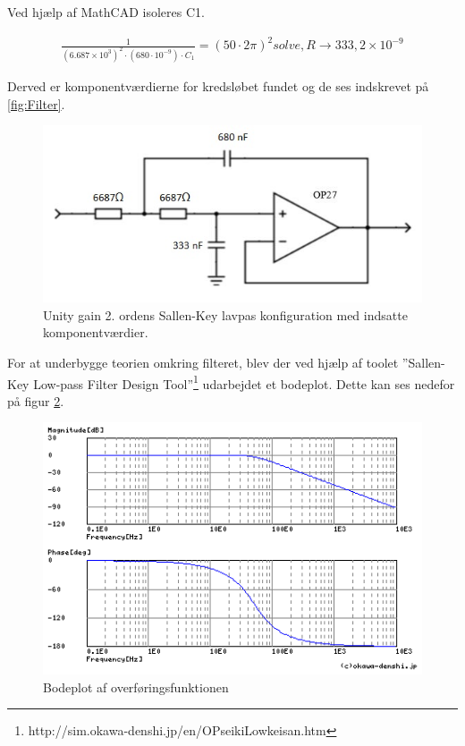 Ved hjælp af MathCAD isoleres C1. 

\begin{align}
	\frac{1}{(6.687\times 10^{3})^{2}\cdot(680\cdot10^{-9})\cdot C_1}=(50\cdot 2\pi)^{2} solve, R \to 333,2\times 10^{-9}
\end{align}

Derved er komponentværdierne for kredsløbet fundet og de ses indskrevet på \ref{fig:Filter}. 

\begin{figure}[H]
	\centering
	\includegraphics[width=1\textwidth]{Figurer/Hardware/FilterDesignMedKomponentvaerdier}
	\caption{Unity gain 2. ordens Sallen-Key lavpas konfiguration med indsatte komponentværdier.}
	\label{fig:Filter_K}
\end{figure}

For at underbygge teorien omkring filteret, blev der ved hjælp af toolet ”Sallen-Key Low-pass Filter Design Tool”\footnote{http://sim.okawa-denshi.jp/en/OPseikiLowkeisan.htm} udarbejdet et bodeplot. Dette kan ses nedefor på figur \ref{fig:Bodeplot}. 

\begin{figure}[H]
	\centering
	\includegraphics[width=1\textwidth]{Figurer/Hardware/Bodeplot}
	\caption[]{Bodeplot af overføringsfunktionen\footnotemark}
	\label{fig:Bodeplot}
\end{figure}


